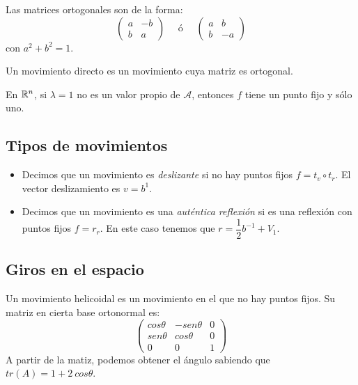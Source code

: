 \begin{ndef}
  Las matrices ortogonales son de la forma:
  \[
    \begin{pmatrix}
      a & -b \\
      b & a
    \end{pmatrix} \quad \text { ó } \quad \begin{pmatrix}
      a & b \\
      b & -a
    \end{pmatrix}
  \]
  con $a^2+b^2 = 1$.
\end{ndef}

\begin{ndef}
  Un movimiento directo es un movimiento cuya matriz es ortogonal.
\end{ndef}
\begin{nprop}
  En $\mathbb{R}^n$, si $\lambda = 1$ no es un valor propio de $\mathcal A$, entonces $f$ tiene un punto fijo y sólo uno.
\end{nprop}

\subsection{Tipos de movimientos}

\begin{ndef}\hfill
  \begin{itemize}
\item Decimos que un movimiento es \textit{deslizante} si no hay puntos fijos $f = t_v \circ t_r$. El vector deslizamiento es $v=b^1$.
\item Decimos que un movimiento es una \textit{auténtica reflexión} si es una reflexión con puntos fijos $f=r_r$. En este caso tenemos que $r= \dfrac{1}{2}b^{-1}+V_1$.
\end{itemize}
\end{ndef}

\subsection{Giros en el espacio}
\begin{ndef}
  Un movimiento helicoidal es un movimiento en el que no hay puntos fijos. Su matriz en cierta base ortonormal es:
  \[
    \begin{pmatrix}
      cos \theta & -sen\theta & 0 \\
      sen \theta & cos\theta & 0\\
      0 & 0 & 1
    \end{pmatrix}
  \]
  A partir de la matiz, podemos obtener el ángulo sabiendo que $tr(A) = 1+2 \ cos\theta$.
\end{ndef}

